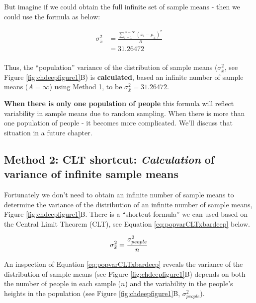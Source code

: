 \documentclass[
]{krantz}
\begin{document}
But imagine if we could obtain the full infinite set of sample means - then we could use the formula as below:

\[
\begin{aligned} 
\sigma_{\bar{x}}^2 &= \frac{\sum_{i=1}^{A=\infty}{(\bar{x}_i - \mu_{\bar{x}})^2}}{A}\\
&= 31.26472\\
\end{aligned} 
\]

Thus, the ``population'' variance of the distribution of sample means (\(\sigma_{\bar{x}}^2\), see Figure \ref{fig:chdeepfigure1}B) is \textbf{calculated}, based an infinite number of sample means (\(A = \infty\)) using Method 1, to be \(\sigma_{\bar{x}}^2 = 31.26472\).

\textbf{When there is only one population of people} this formula will reflect variability in sample means due to random sampling. When there is more than one population of people - it becomes more complicated. We'll discuss that situation in a future chapter.

\hypertarget{method-2-clt-shortcut-calculation-of-variance-of-infinite-sample-means}{%
\subsection{\texorpdfstring{Method 2: CLT shortcut: \emph{Calculation} of variance of infinite sample means}{Method 2: CLT shortcut: Calculation of variance of infinite sample means}}\label{method-2-clt-shortcut-calculation-of-variance-of-infinite-sample-means}}

Fortunately we don't need to obtain an infinite number of sample means to determine the variance of the distribution of an infinite number of sample means, Figure \ref{fig:chdeepfigure1}B. There is a ``shortcut formula'' we can used based on the Central Limit Theorem (CLT), see Equation \eqref{eq:popvarCLTxbardeep} below.

\begin{equation} 
\sigma_{\bar{x}}^2 = \frac{\sigma_{people}^2}{n}\\
      \label{eq:popvarCLTxbardeep}
\end{equation}

An inspection of Equation \eqref{eq:popvarCLTxbardeep} reveals the variance of the distribution of sample means (see Figure \ref{fig:chdeepfigure1}B) depends on both the number of people in each sample (\(n\)) and the variability in the people's heights in the population (see Figure \ref{fig:chdeepfigure1}B, \(\sigma_{people}^2\)).
\end{document}
